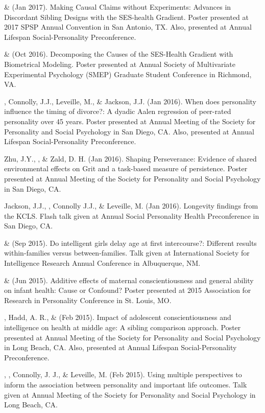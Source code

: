 \begin{etaremune}
%
\item\meb \& \joe (Jan 2017). Making Causal Claims without Experiments: Advances in Discordant Sibling Designs with the SES-health Gradient. Poster presented at 2017 SPSP Annual Convention in San Antonio, TX. Also, presented at Annual Lifespan Social-Personality Preconference.
%
\item\meb \& \joe (Oct 2016). Decomposing the Causes of the SES-Health Gradient with Biometrical Modeling. Poster presented at Annual Society of Multivariate Experimental Psychology (SMEP) Graduate Student Conference in Richmond, VA.
%
\item \meb, Connolly, J.J., Leveille, M., \& Jackson, J.J. (Jan 2016). When does personality influence the timing of divorce?: A dyadic Aalen regression of peer-rated personality over 45 years. Poster presented at Annual Meeting of the Society for Personality and Social Psychology in San Diego, CA. Also, presented at Annual Lifespan Social-Personality Preconference.
%
\item Zhu, J.Y., \meb, \joe \& Zald, D. H. (Jan 2016). Shaping Perseverance: Evidence of shared environmental effects on Grit and a task-based measure of persistence. Poster presented at Annual Meeting of the Society for Personality and Social Psychology in San Diego, CA.
%
\item Jackson, J.J., \meb, Connolly J.J., \& Leveille, M. (Jan 2016). Longevity findings from the KCLS. Flash talk given at Annual Social Personality Health Preconference in San Diego, CA. %
%
\item \joe \& \meb (Sep 2015). Do intelligent girls delay age at first intercourse?: Different results within-families versus between-families. Talk given at International Society for Intelligence Research Annual Conference in Albuquerque, NM.
%
\item \meb \& \joe (Jun 2015). Additive effects of maternal conscientiousness and general ability on infant health: Cause or Confound? Poster presented at 2015 Association for Research in Personality Conference in St. Louis, MO. %
%
\item \meb, Hadd, A. R., \& \joe (Feb 2015). Impact of adolescent conscientiousness and intelligence on health at middle age: A sibling comparison approach. Poster presented at Annual Meeting of the Society for Personality and Social Psychology in Long Beach, CA. Also, presented at Annual Lifespan Social-Personality Preconference.
%
\item \jjj, \meb, Connolly, J. J., \& Leveille, M. (Feb 2015). Using multiple perspectives to inform the association between personality and important life outcomes. Talk given at Annual Meeting of the Society for Personality and Social Psychology in Long Beach, CA.

\end{etaremune}
